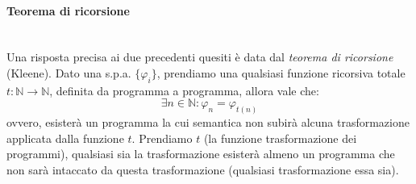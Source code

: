 \documentclass{article}
\begin{document}
\paragraph{Teorema di ricorsione}\mbox{}\\
Una risposta precisa ai due precedenti quesiti è data dal \textit{teorema di ricorsione} (Kleene).
Dato una s.p.a. $\{\varphi_i\}$, prendiamo una qualsiasi funzione ricorsiva totale $t:\mathbb{N}\rightarrow\mathbb{N}$,
 definita da programma a programma, allora vale che:
$$\exists n\in\mathbb{N}:\varphi_n=\varphi_{t(n)}$$
ovvero, esisterà un programma la cui semantica non subirà alcuna trasformazione applicata dalla funzione
$t$. Prendiamo $t$ (la funzione trasformazione dei programmi), qualsiasi sia la trasformazione esisterà
almeno un programma che non sarà intaccato da questa trasformazione (qualsiasi trasformazione essa sia).
\end{document}
